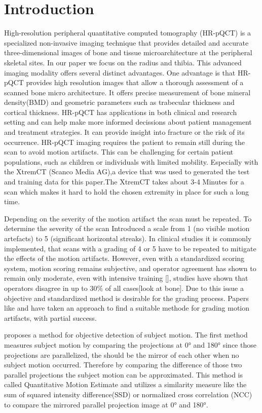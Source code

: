 \documentclass[
a4paper, 
12pt,
grayscalebody, %
abstract=on,
twoside, BCOR10mm, 12pt, DIV13,headinclude, footexclude, final, abstracton, openright
]{ibireprt}
\numberwithin{equation}{chapter}
\numberwithin{table}{chapter}
\numberwithin{figure}{chapter}
\numberwithin{algorithm}{chapter}
\numberwithin{example}{chapter}
\numberwithin{example}{chapter}
\begin{document}
\chapter{Introduction}

High-resolution peripheral quantitative computed tomography (HR-pQCT) is a specialized non-invasive imaging technique that provides detailed and accurate three-dimensional images of bone and tissue microarchitecture at the peripheral skeletal sites. In our paper we focus  on the radius and thibia. This advanced imaging modality offers several distinct advantages. One advantage is that HR-pQCT provides high resolution images that allow a thorough assessment of a scanned bone micro architecture. It offers precise measurement of bone mineral density(BMD) and geometric parameters such as trabecular thickness and cortical thickness. HR-pQCT has applications in both clinical and research setting and can help make more informed decissions about patient management and treatment strategies. It can provide insight into fracture or the risk of its occurrence. HR-pQCT imaging requires the patient to remain still during the scan to avoid motion artifacts. This can be challenging for certain patient populations, such as children or individuals with limited  mobility. Especially with the XtremCT (Scanco Media AG),a device that  was used to generated the test and training data for this paper.The XtremCT takes about 3-4 Minutes for a scan which makes it hard to hold the chosen extremity in place for such a long time.

 Depending on the severity of the motion artifact the scan must be repeated. To determine the severity of the scan \cite{Whittier2020} Introduced a scale from 1 (no visible motion artefacts) to 5 (significant horizontal streaks). In clinical studies it is commonly implemented, that scans with a grading of 4 or 5 have to be repeated to mitigate the effects of the motion artifacts. However, even with a standardized scoring system, motion scoring remains subjective, and operator agreement has shown to remain only moderate, even with intensive training [], studies have shown that operators disagree in up to 30\% of all cases[look at bone]. Due to this issue a objective and standardized method is desirable for the grading process. Papers like \cite{Sode2011} and \cite{Walle2023} have taken an approach to find a suitable methode for grading motion artifacts, with partial success.
 
\cite{Walle2023} proposes a method for objective detection of subject motion. The first method measures subject motion by comparing the projections at 0° and 180° since those projections are parallelized, the should be the mirror of each other when no subject motion occurred. Therefore by comparing the difference of those two parallel projections the subject motion can be approximated. This method is called Quantitative Motion Estimate and utilizes a similarity measure like the sum of squared intensity difference(SSD) or normalized cross correlation (NCC) to compare the mirrored parallel projection image at 0° and 180°.
\end{document}

